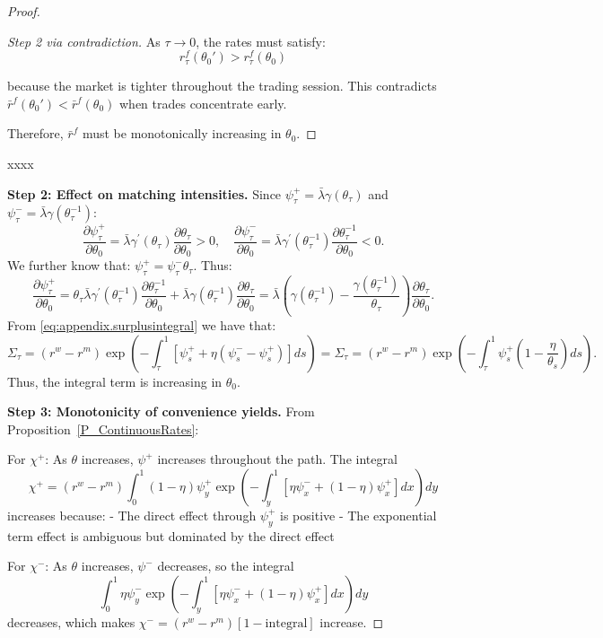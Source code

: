 \begin{proof}
\begin{proof}[Step 2 via contradiction]
As $\tau \to 0$, the rates must satisfy:
\[
r_{\tau}^f(\theta_0') > r_{\tau}^f(\theta_0)
\]

because the market is tighter throughout the trading session. This contradicts $\bar{r}^f(\theta_0') < \bar{r}^f(\theta_0)$ when trades concentrate early.

Therefore, $\bar{r}^f$ must be monotonically increasing in $\theta_0$.
\end{proof}

xxxx


\textbf{Step 2: Effect on matching intensities.} Since $\psi_{\tau}^{+} = \bar{\lambda}\gamma(\theta_{\tau})$ and $\psi_{\tau}^{-} = \bar{\lambda}\gamma(\theta_{\tau}^{-1})$:
\[
\frac{\partial\psi_{\tau}^{+}}{\partial\theta_0}=\bar{\lambda}\gamma^{\prime}(\theta_{\tau})\frac{\partial\theta_{\tau}}{\partial\theta_0}>0,\quad
\frac{\partial\psi_{\tau}^{-}}{\partial\theta_0}=\bar{\lambda}\gamma^{\prime}(\theta_{\tau}^{-1})\frac{\partial\theta_{\tau}^{-1}}{\partial\theta_0}<0.
\]
We further know that:
$\psi_{\tau}^{+} = \psi_{\tau}^{-}\theta_{\tau}$. Thus:
\[
\frac{\partial\psi_{\tau}^{+}}{\partial\theta_0}=
\theta_{\tau}\bar{\lambda}\gamma^{\prime}(\theta_{\tau}^{-1})\frac{\partial\theta_{\tau}^{-1}}{\partial\theta_0}+\bar{\lambda}\gamma(\theta_{\tau}^{-1})\frac{\partial\theta_{\tau}}{\partial\theta_0}=\bar{\lambda}\left(\gamma(\theta_{\tau}^{-1})-\frac{\gamma(\theta_{\tau}^{-1})}{\theta_{\tau}}\right)\frac{\partial\theta_{\tau}}{\partial\theta_0}.
\]
From \eqref{eq:appendix.surplusintegral} we have that:
\begin{equation*}
\Sigma_{\tau} = (r^{w} - r^{m})\exp\left(-\int_{\tau}^{1}[\psi_{s}^{+}+\eta(\psi_{s}^{-} -\psi_{s}^{+})]ds\right)=\Sigma_{\tau} = (r^{w} - r^{m})\exp\left(-\int_{\tau}^{1}\psi_{s}^{+}(1-\frac{\eta}{\theta_s})ds\right).
\end{equation*}
Thus, the integral term is increasing in $\theta_0.$

\textbf{Step 3: Monotonicity of convenience yields.} From Proposition~\ref{P_ContinuousRates}:

For $\chi^{+}$: As $\theta$ increases, $\psi^{+}$ increases throughout the path. The integral
\[
\chi^{+} = (r^{w} - r^{m})\int_{0}^{1}(1-\eta)\psi_{y}^{+}\exp\left(-\int_{y}^{1}[\eta\psi_{x}^{-} + (1-\eta)\psi_{x}^{+}]dx\right)dy
\]
increases because:
- The direct effect through $\psi_{y}^{+}$ is positive
- The exponential term effect is ambiguous but dominated by the direct effect

For $\chi^{-}$: As $\theta$ increases, $\psi^{-}$ decreases, so the integral
\[
\int_{0}^{1}\eta\psi_{y}^{-}\exp\left(-\int_{y}^{1}[\eta\psi_{x}^{-} + (1-\eta)\psi_{x}^{+}]dx\right)dy
\]
decreases, which makes $\chi^{-} = (r^{w} - r^{m})[1 - \text{integral}]$ increase.


\end{proof}

